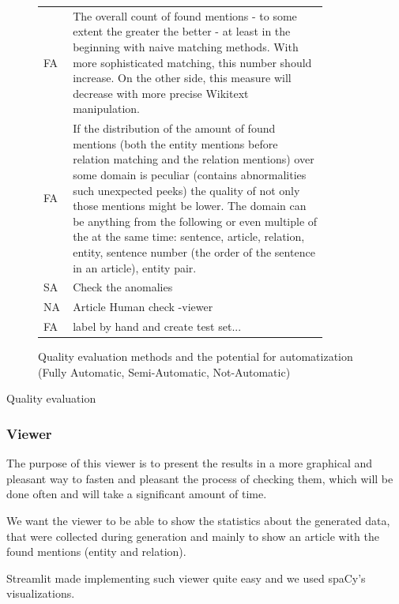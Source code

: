 \begin{figure}

\begin{tabular}{p{0.05\linewidth}p{0.8\linewidth}}

FA & The overall count of found mentions - to some extent the greater the better - at least in the beginning with naive matching methods. With more sophisticated matching, this number should increase. On the other side, this measure will decrease with more precise Wikitext manipulation. \\ 
FA & If the distribution of the amount of found mentions (both the entity mentions before relation matching and the relation mentions) over some domain is peculiar (contains abnormalities such unexpected peeks) the quality of not only those mentions might be lower. The domain can be anything from the following or even multiple of the at the same time:
sentence, article, relation, entity, sentence number (the order of the sentence in an article), entity pair. \\ 
SA & Check the anomalies \\ 
NA & Article Human check -viewer \\ 
FA & label by hand and create test set...\\

\end{tabular} 

\caption{Quality evaluation methods and the potential for automatization (Fully Automatic, Semi-Automatic, Not-Automatic)}
\end{figure}
Quality evaluation


\subsubsection{Viewer}

The purpose of this viewer is to present the results in a more graphical and pleasant way to fasten and pleasant the process of checking them, which will be done often and will take a significant amount of time.

We want the viewer to be able to show the statistics about the generated data, that were collected during generation and mainly to show an article with the found mentions (entity and relation). 

Streamlit made implementing such viewer quite easy and we used spaCy’s  visualizations.






